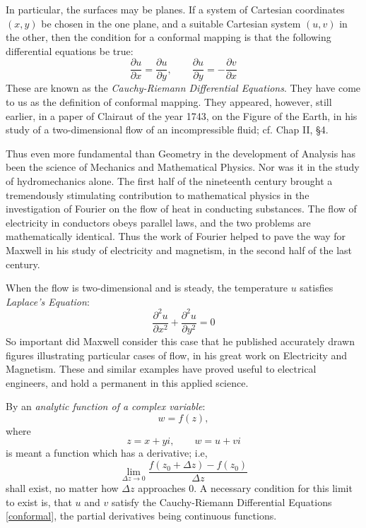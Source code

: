 \documentclass[letter,oneside]{memoir}
\begin{document}
In particular, the surfaces may be planes. If a system of Cartesian coordinates $(x,y)$ be chosen in the one plane, and a suitable Cartesian system  $(u,v)$ in the other, then the condition for a conformal mapping is that the following differential equations be true:
\begin{equation}\label{conformal}
\frac{\partial u}{\partial x} =\frac{\partial u}{\partial y} , \qquad \frac{\partial u}{\partial y} =-\frac{\partial v}{\partial x} 
\end{equation} 
These are known as the \emph{Cauchy-Riemann Differential Equations}. They have come to us as the definition of conformal mapping. They appeared, however, still earlier, in a paper of Clairaut of the year 1743, on the Figure of the Earth, in his study of a two-dimensional flow of an incompressible fluid; cf. Chap II, \S 4. 

Thus even more fundamental than Geometry in the development of Analysis has been the science of Mechanics and Mathematical Physics. Nor was it in the study of hydromechanics alone. The first half of the nineteenth century brought a tremendously stimulating contribution to mathematical physics in the investigation of Fourier on the flow of heat in conducting substances. The flow of electricity in conductors obeys parallel laws, and the two problems are mathematically identical. Thus the work of Fourier helped to pave the way for Maxwell in his study of electricity and magnetism, in the second half of the last century. 

When the flow is two-dimensional and is steady, the temperature $u$ satisfies \emph{Laplace's Equation}:
\begin{equation}\label{laplace}
\frac{\partial^2 u}{\partial x^2} +\frac{\partial^2 u}{\partial y^2} =0
\end{equation}
So important did Maxwell consider this case that he published accurately drawn figures illustrating particular cases of flow, in his great work on Electricity and Magnetism. These and similar examples have proved useful to electrical engineers, and hold a permanent in this applied science. 

By an \emph{analytic function of a complex variable}:
\[
	w=f(z)
,\]where 
\[
z=x+yi, \qquad w=u+vi
\] is meant a function which has a derivative; i.e, 
\[
	\lim\limits_{\Delta z \to 0} \frac{f(z_0+\Delta z)-f(z_0)}{\Delta z} 
\] shall exist, no matter how $\Delta z$ approaches $0$. A necessary condition for this limit to exist is, that $u$ and $v$ satisfy the Cauchy-Riemann Differential Equations \ref{conformal}, the partial derivatives being continuous functions. 
\end{document}
